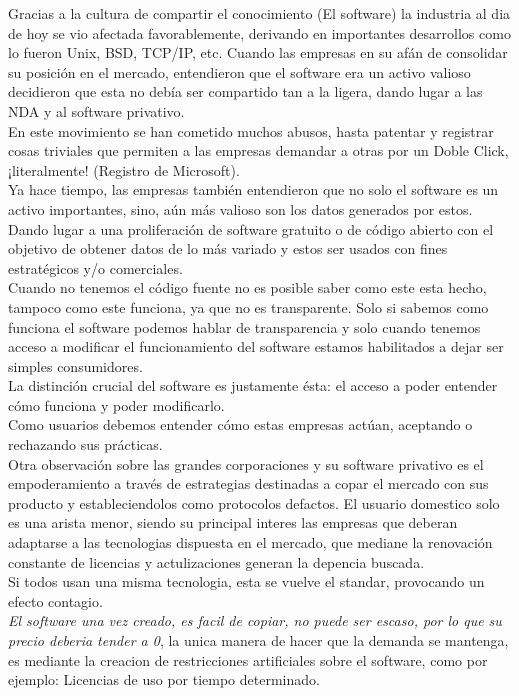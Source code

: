 \documentclass{book}
\begin{document}
Gracias a la cultura de compartir el conocimiento (El software) la industria al dia de hoy se vio afectada favorablemente, derivando en importantes desarrollos como lo fueron Unix, BSD, TCP/IP, etc.
Cuando las empresas en su afán de consolidar su posición en el mercado, entendieron que el software era un activo valioso decidieron que esta no debía ser compartido tan a la ligera, dando lugar a las NDA y al software privativo.
\\
En este movimiento se han cometido muchos abusos, hasta patentar y registrar cosas triviales que permiten a las empresas demandar a otras por un Doble Click, ¡literalmente! (Registro de Microsoft).
\\
Ya hace tiempo, las empresas también entendieron  que no solo el software es un activo importantes, sino, aún más valioso son los datos generados por estos. Dando lugar a una proliferación de software gratuito o de código abierto con el objetivo de obtener datos de lo más variado y estos ser usados con fines estratégicos y/o comerciales.
\\
Cuando no tenemos el código fuente no es posible saber como este esta hecho, tampoco como este funciona, ya que no es transparente. 
Solo si sabemos como funciona el software podemos hablar de transparencia y solo cuando tenemos acceso a modificar el funcionamiento del software estamos habilitados a dejar ser simples consumidores.
\\
La distinción crucial del software es justamente ésta: el acceso a poder entender cómo funciona y poder modificarlo. 
\\
Como usuarios debemos entender cómo estas empresas actúan, aceptando o rechazando sus prácticas.
\\
Otra observación sobre las grandes corporaciones y su software privativo es el empoderamiento a través de estrategias destinadas a copar el mercado con sus producto y estableciendolos como protocolos defactos.
El usuario domestico solo es una arista menor, siendo su principal interes las empresas que deberan adaptarse a las tecnologias dispuesta en el mercado, que mediane la renovación constante de licencias y actulizaciones generan la depencia buscada.
\\
Si todos usan una misma tecnologia, esta se vuelve el standar, provocando un efecto contagio.
\\
\emph{El software una vez creado, es facil de copiar, no puede ser escaso, por lo que su precio deberia tender a 0}, la unica manera de hacer que la demanda se mantenga, es mediante la creacion de restricciones artificiales sobre el software, como por ejemplo: Licencias de uso por tiempo determinado.
\end{document}
